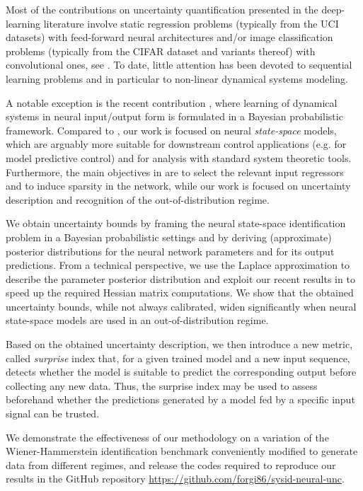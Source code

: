 \documentclass{article}
\begin{document}
Most of the contributions on uncertainty quantification presented in the deep-learning literature involve static regression problems (typically from the UCI datasets) with feed-forward neural architectures and/or image classification problems (typically from the CIFAR dataset and variants thereof) with convolutional ones, see \cite{maddox2019simple, wilson2020bayesian, izmailov2021bayesian}. To date, little attention has been devoted to sequential learning problems and in particular 
to non-linear dynamical systems modeling.


A notable exception is the recent contribution \citep{zhou2022sparse}, where learning of dynamical systems in neural input/output form is formulated  
in a Bayesian probabilistic framework. Compared to \citep{zhou2022sparse}, our work is focused on neural \emph{state-space} models, which are arguably more suitable for downstream control applications (e.g. for model predictive control) and for analysis with standard system theoretic tools. Furthermore, the main objectives in \citep{zhou2022sparse} are to select the relevant input regressors and to induce sparsity in the network, while our work is focused on uncertainty description and recognition of the out-of-distribution regime. 

We obtain uncertainty bounds by framing the neural state-space identification problem in a Bayesian probabilistic settings and by deriving 
(approximate) posterior distributions for the neural network parameters and for its output predictions.
From a technical perspective, we use the Laplace approximation \citep{bishop2006pattern} to describe the parameter posterior distribution and exploit our recent results 
in \citep{forgione2022adaptation} to speed up the required Hessian matrix computations.
We show that the obtained uncertainty bounds, while not always calibrated, widen significantly when neural state-space models are used in an out-of-distribution regime. 

Based on the obtained uncertainty description, we then introduce a new metric, called \emph{surprise} index that, for a given trained model and a {new} input sequence, detects whether the model is suitable to predict the corresponding output before collecting any new data. 
Thus, the surprise index may be used to assess beforehand whether the predictions generated by a model fed by a specific input
signal can be trusted.

We demonstrate the effectiveness of our methodology on a variation of the Wiener-Hammerstein identification benchmark \citep{schoukens2009wiener} conveniently modified to generate data from different regimes, and release the codes required to reproduce our results in the GitHub repository \url{https://github.com/forgi86/sysid-neural-unc}.
\end{document}

